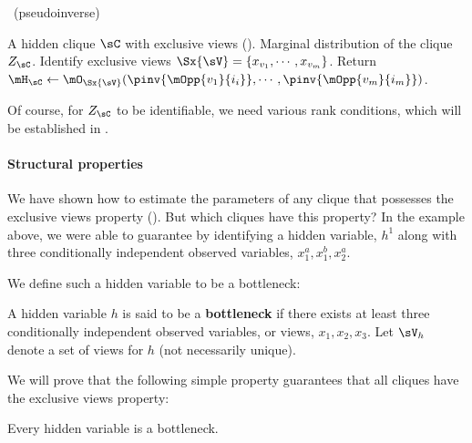 \renewcommand{\algorithmicrequire}{\textbf{Input:}}
\renewcommand{\algorithmicensure}{\textbf{Output:}}
\begin{algorithm}
  \caption{\LearnClique~(pseudoinverse)}
  \label{algo:learnclique}
  \begin{algorithmic}
    \REQUIRE A hidden clique $\sC$ with exclusive views ().
    \ENSURE Marginal distribution of the clique $Z_\sC$.
      \STATE Identify exclusive views $\Sx{\sV} = \{x_{v_1}, \cdots, x_{v_m}\}$.
      \STATE Return $\mH_\sC \gets \mO_{\Sx{\sV}}( \pinv{\mOpp{v_1}{i_i}}, \cdots, \pinv{\mOpp{v_m}{i_m}} )$.
  \end{algorithmic}
\end{algorithm}
Of course, for $Z_{\sC}$ to be identifiable, we need various rank conditions,
which will be established in .

\paragraph{Structural properties}

We have shown how to estimate the parameters of any clique that possesses the exclusive
  views property (). But which cliques have this property?
In the example above, we were able to guarantee 
  by identifying a hidden variable, $h^1$ along with three conditionally
  independent observed variables, $x^a_1, x^b_1, x^a_2$.

We define such a hidden variable to be a bottleneck:
\begin{definition}[Bottleneck]
  A hidden variable $h$ is said to be a \textbf{bottleneck} if there exists at
    least three conditionally independent observed variables, or views,
    $x_1, x_2, x_3$. 
  Let $\sV_{h}$ denote a set of views for $h$ (not necessarily unique).
\end{definition}

We will prove that the following simple property guarantees that all cliques
have the exclusive views property:
\begin{property}
  \label{prop:bottleneck}
  Every hidden variable is a bottleneck.
\end{property}

